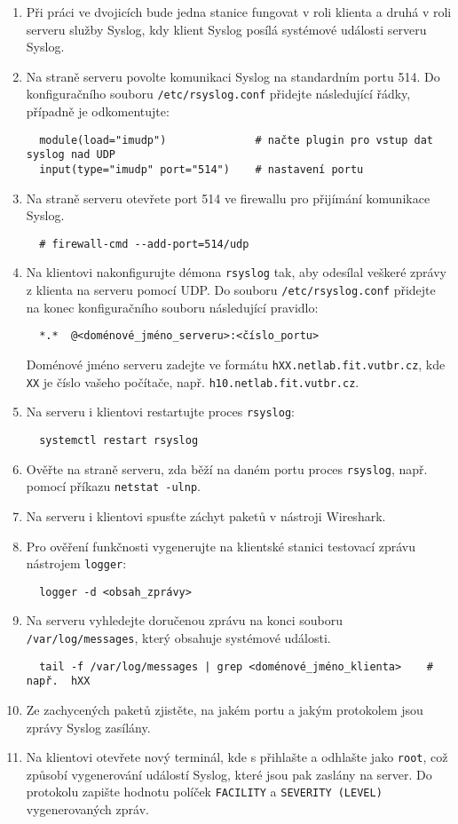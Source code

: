 \documentclass[a4paper,11pt]{article}
\begin{document}
\begin{enumerate}
  \item Při práci ve dvojicích bude jedna stanice fungovat v roli klienta a druhá v roli serveru služby Syslog, kdy klient Syslog posílá systémové události serveru Syslog.
  \item Na straně serveru povolte komunikaci Syslog na standardním portu 514. Do konfiguračního souboru {\tt /etc/rsyslog.conf} přidejte následující řádky, případně je odkomentujte:
    \vspace{-2mm}
\begin{verbatim}
  module(load="imudp")              # načte plugin pro vstup dat syslog nad UDP
  input(type="imudp" port="514")    # nastavení portu
\end{verbatim}
  \item Na straně serveru otevřete port 514 ve firewallu pro přijímání komunikace Syslog.
\begin{verbatim}
  # firewall-cmd --add-port=514/udp
\end{verbatim}
  \item  Na klientovi nakonfigurujte démona {\tt rsyslog} tak, aby odesílal veškeré zprávy z klienta na serveru pomocí UDP.
    Do souboru {\tt /etc/rsyslog.conf} přidejte na konec konfiguračního souboru následující pravidlo:
\begin{verbatim} 
  *.*  @<doménové_jméno_serveru>:<číslo_portu>
\end{verbatim}
    {\small Doménové jméno serveru zadejte ve formátu \texttt{hXX.netlab.fit.vutbr.cz}, kde \texttt{XX} je číslo vašeho počítače, např. \texttt{h10.netlab.fit.vutbr.cz}.}
  \item Na serveru i klientovi restartujte proces {\tt rsyslog}: 
\begin{verbatim}
  systemctl restart rsyslog
\end{verbatim} 
  \item Ověřte na straně serveru, zda běží na daném portu proces {\tt rsyslog}, např. pomocí příkazu \verb|netstat -ulnp|.
  \item Na serveru i klientovi spusťte záchyt paketů v nástroji Wireshark. 
  \item Pro ověření funkčnosti vygenerujte na klientské stanici testovací zprávu nástrojem {\tt logger}:
\begin{verbatim} 
  logger -d <obsah_zprávy>
\end{verbatim} 
  \item Na serveru vyhledejte doručenou zprávu na konci souboru {\tt /var/log/messages}, který obsahuje
        systémové události.
\begin{verbatim} 
  tail -f /var/log/messages | grep <doménové_jméno_klienta>    # např.  hXX
\end{verbatim} 
  \item Ze zachycených paketů zjistěte, na jakém portu a jakým protokolem jsou zprávy Syslog zasílány.
  \item Na klientovi otevřete nový terminál, kde s přihlašte a odhlašte jako {\tt root}, což způsobí vygenerování událostí Syslog, které jsou pak zaslány na server. Do protokolu zapište hodnotu políček {\tt FACILITY} a {\tt SEVERITY (LEVEL)} vygenerovaných zpráv.
\end{enumerate}
\end{document}
